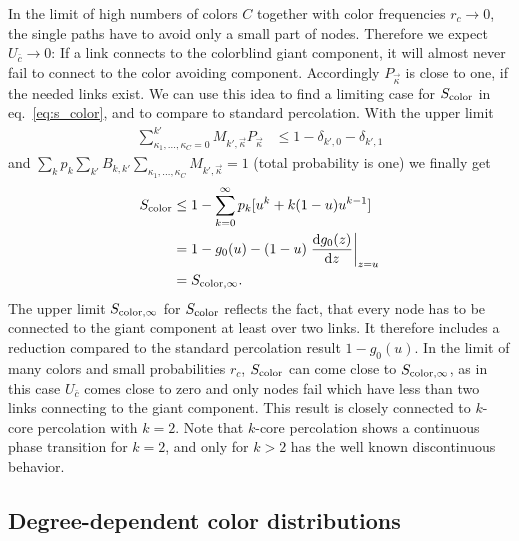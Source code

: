 \documentclass[aps, pre, onecolumn, a4paper, floatfix]{revtex4}
\begin{document}
In the limit of high numbers of colors $C$ together with color frequencies $r_c \to 0$, the 
single paths have to avoid only a small part of nodes. Therefore we expect $U_{\bar c}\to 0$: If a 
link connects to the colorblind giant component, it will almost never fail to connect to 
the color avoiding component. Accordingly $P_{\vec \kappa}$ is close to one, if the needed 
links exist. We can use this idea to find a limiting case for $S_{\rm color}$ in eq.~\ref{eq:s_color}, 
and to compare to standard percolation. With the upper limit 
\begin{align}
\sum_{\kappa_1,\dots, \kappa_C=0}^{k'} M_{k',\vec \kappa} 
P_{\vec \kappa} &\leq 1-\delta_{k',0}-\delta_{k',1}
\end{align}
and $\sum_{k}p_k \sum_{k'} B_{k,k'} \sum_{\kappa_1,\dots, \kappa_C} M_{k',\vec \kappa} = 1$ 
(total probability is one) we finally get 
%
\begin{align}
S_{\rm color} &\leq 1-\sum_{k=0}^{\infty}p_k [u^k +k (1-u) u^{k-1}]\\
 &= 1 - g_0(u) - (1-u) \left.\frac{{\rm d}g_0(z)}{{\rm d}z}\right|_{z=u}\\
 &= S_{{\rm color},\infty}.\label{eq:limit}
\end{align}
%
The upper limit $S_{{\rm color},\infty}$ for $S_{\rm color}$ reflects the fact, that every node has to be 
connected to the giant component at least over two links. It therefore includes a reduction 
compared to the standard percolation result $1-g_0(u)$. In the limit of many colors and small 
probabilities $r_c$, $S_{\rm color}$ can come close to $S_{{\rm color},\infty}$, as in this case $U_{\bar c}$ comes 
close to zero and only nodes fail which have less than two links connecting to the giant component. 
This result is closely connected to $k$-core percolation with $k=2$. Note that $k$-core percolation shows 
a continuous phase transition for $k=2$, and only for $k>2$ has the well known discontinuous behavior. 

\subsection{Degree-dependent color distributions}\label{subsec:degree}
\end{document}

